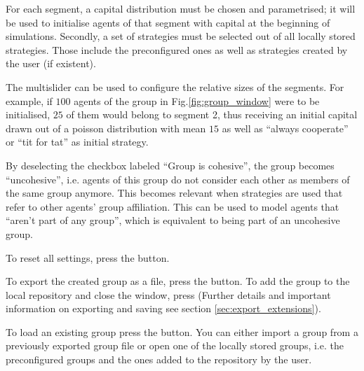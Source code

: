 \documentclass[parskip=full,11pt]{scrartcl}
\newlength\myheight
\newlength\mydepth
\newcommand*\inlinegraphics[1]{%
  \settototalheight\myheight{Xygp}%
  \settodepth\mydepth{Xygp}%
  \raisebox{-1.8\mydepth}{\texttt{[image: \#1]}}%
}
\begin{document}
For each segment, a capital distribution must be chosen and parametrised; it will be used to initialise agents of that segment with capital at the beginning of simulations. Secondly, a set of strategies must be selected out of all locally stored strategies. Those include the preconfigured ones as well as strategies created by the user (if existent).

The multislider can be used to configure the relative sizes of the segments. For example, if \(100\) agents of the group in Fig.\ref{fig:group_window} were to be initialised, \(25\) of them would belong to segment 2, thus receiving an initial capital drawn out of a poisson distribution with mean \(15\) as well as \enquote{always cooperate} or \enquote{tit for tat} as initial strategy.

By deselecting the checkbox labeled \enquote{Group is cohesive}, the group becomes \enquote{uncohesive}, i.e. agents of this group do not consider each other as members of the same group anymore. This becomes relevant when strategies are used that refer to other agents' group affiliation. This can be used to model agents that \enquote{aren't part of any group}, which is equivalent to being part of an uncohesive group.

To reset all settings, press the  \inlinegraphics{img_manual/rotate_left_button.png} button.

To export the created group as a file, press the  \inlinegraphics{img_manual/export_button.png} button. To add the group to the local repository and close the window, press  \inlinegraphics{img_manual/check_button.png} (Further details and important information on exporting and saving see section \ref{sec:export_extensions}).

To load an existing group press the  \inlinegraphics{img_manual/import_button.png} button. You can either import a group from a previously exported group file or open one of the locally stored groups, i.e. the preconfigured groups and the ones added to the repository by the user.
\end{document}
